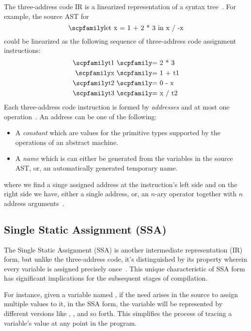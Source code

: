 \documentclass[
  oneside,
  english,
  coorientadorbanca,
  noabntexcite
]{ufsc-thesis-rn46-2019}
\newcommand{\code}[1]{\text{\scpfamily\setlength\spaceskip{0.35em}#1}}
\begin{document}
The three-address code IR is a linearized representation of a syntax tree~\cite{Aho:2006:CPT:1177220}.
For example, the source AST for
\begin{equation*}
  \code{let x = 1 + 2 * 3 in x / -x}
\end{equation*}
could be linearized as the following sequence of three-address code assignment instructions:
\begin{align*}
  \code{t1} \  & \code{= 2 * 3}  \\
  \code{x}  \  & \code{= 1 + t1} \\
  \code{t2} \  & \code{= 0 - x}  \\
  \code{t3} \  & \code{= x / t2}
\end{align*}
Each three-address code instruction is formed by \textit{addresses} and at most one operation~\cite{Aho:2006:CPT:1177220}.
An address can be one of the following:
\begin{itemize}
  \item A \textit{constant} \code{c} which are values for the primitive types supported by the operations of an abstract machine.

  \item A \textit{name} \code{n} which is can either be generated from the variables in the source AST, or, an automatically generated temporary name.
\end{itemize}

where we find a singe assigned address at the instruction's left side and on the right side we have, either a single address, or, an $n$-ary operator together with $n$ address arguments~\cite{Aho:2006:CPT:1177220}.

\subsection{Single Static Assignment (SSA)}

The Single Static Assignment (SSA) is another intermediate representation (IR) form, but unlike the three-address code, it's distinguished by its property wherein every variable is assigned precisely once~\cite{10.1145/115372.115320}.
This unique characteristic of SSA form has significant implications for the subsequent stages of compilation.

For instance, given a variable named \code{x}, if the need arises in the source to assign multiple values to it, in the SSA form, the variable will be represented by different versions like \code{x1}, \code{x2}, and so forth.
This simplifies the process of tracing a variable's value at any point in the program.
\end{document}
